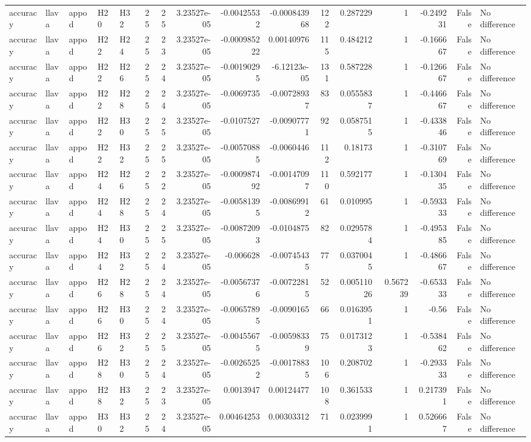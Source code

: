 \begin{longtable}{lllllrrrrrrrrrrl}
accuracy & llava & appod & H20 & H32 & 25 & 25 & 3.23527e-05 & -0.00425532 & -0.000843968 & 122 & 0.287229 & 1 & -0.249231 & False & No difference \\
accuracy & llava & appod & H22 & H24 & 25 & 23 & 3.23527e-05 & -0.000985222 & 0.00140976 & 115 & 0.484212 & 1 & -0.166667 & False & No difference \\
accuracy & llava & appod & H22 & H26 & 25 & 24 & 3.23527e-05 & -0.00190295 & -6.12123e-05 & 131 & 0.587228 & 1 & -0.126667 & False & No difference \\
accuracy & llava & appod & H22 & H28 & 25 & 24 & 3.23527e-05 & -0.0069735 & -0.00728937 & 83 & 0.0555837 & 1 & -0.446667 & False & No difference \\
accuracy & llava & appod & H22 & H30 & 25 & 25 & 3.23527e-05 & -0.0107527 & -0.00907771 & 92 & 0.0587515 & 1 & -0.433846 & False & No difference \\
accuracy & llava & appod & H22 & H32 & 25 & 25 & 3.23527e-05 & -0.00570885 & -0.0060446 & 112 & 0.18173 & 1 & -0.310769 & False & No difference \\
accuracy & llava & appod & H24 & H26 & 25 & 22 & 3.23527e-05 & -0.000987492 & -0.00147097 & 110 & 0.592177 & 1 & -0.130435 & False & No difference \\
accuracy & llava & appod & H24 & H28 & 25 & 24 & 3.23527e-05 & -0.00581395 & -0.00869912 & 61 & 0.010995 & 1 & -0.593333 & False & No difference \\
accuracy & llava & appod & H24 & H30 & 25 & 25 & 3.23527e-05 & -0.00872093 & -0.0104875 & 82 & 0.0295784 & 1 & -0.495385 & False & No difference \\
accuracy & llava & appod & H24 & H32 & 25 & 24 & 3.23527e-05 & -0.006628 & -0.00745435 & 77 & 0.0370045 & 1 & -0.486667 & False & No difference \\
accuracy & llava & appod & H26 & H28 & 25 & 24 & 3.23527e-05 & -0.00567376 & -0.00722815 & 52 & 0.00511026 & 0.567239 & -0.653333 & False & No difference \\
accuracy & llava & appod & H26 & H30 & 25 & 24 & 3.23527e-05 & -0.00657895 & -0.0090165 & 66 & 0.0163951 & 1 & -0.56 & False & No difference \\
accuracy & llava & appod & H26 & H32 & 25 & 25 & 3.23527e-05 & -0.00455675 & -0.00598339 & 75 & 0.0173123 & 1 & -0.538462 & False & No difference \\
accuracy & llava & appod & H28 & H30 & 25 & 24 & 3.23527e-05 & -0.00265252 & -0.00178835 & 106 & 0.208702 & 1 & -0.293333 & False & No difference \\
accuracy & llava & appod & H28 & H32 & 25 & 23 & 3.23527e-05 & 0.0013947 & 0.00124477 & 108 & 0.361533 & 1 & 0.217391 & False & No difference \\
accuracy & llava & appod & H30 & H32 & 25 & 24 & 3.23527e-05 & 0.00464253 & 0.00303312 & 71 & 0.0239991 & 1 & 0.526667 & False & No difference \\
\end{longtable}
